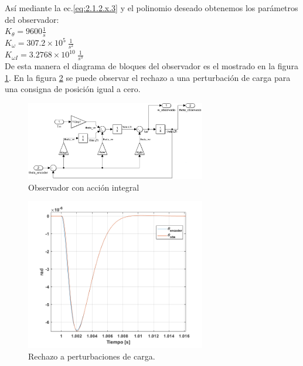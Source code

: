 \documentclass[10pt]{article}
\begin{document}
\begin{itemize}
	Así mediante la ec.\ref{eq:2.1.2.x.3} y el polinomio deseado obtenemos los parámetros del observador:\\
	$K_{\theta}=9600 \frac{1}{s}$\\
	$K_{\omega}=307.2 \times 10^{5} \ \frac{1}{s^{2}}$\\
	$K_{\omega I}=3.2768 \times  10^{10} \ \frac{1}{s^{3}}$\\

	De esta manera el diagrama de bloques del observador es el mostrado en la figura \ref{fig:observadornuevo}. En la figura \ref{fig:obs} se puede observar el rechazo a una perturbación de carga para una consigna de posición igual a cero.\\
	\begin{figure}[h!]
		\centering
		\includegraphics[width=0.7\textwidth]{observadornuevo.png}
		\caption{\label{fig:observadornuevo}Observador con acción integral}
		\end{figure}
	
	\begin{figure}[h!]
		\centering
		\includegraphics[width=0.7\textwidth]{obs.png}
		\caption{\label{fig:obs}Rechazo a perturbaciones de carga.}
		\end{figure}


\end{itemize}
\end{document}

